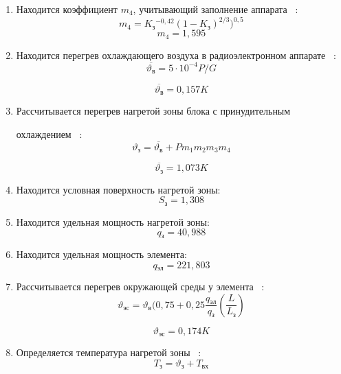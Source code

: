\begin{enumerate}[label={\arabic*.}]
\item Находится коэффициент $m_4$,
   учитывающий заполнение аппарата ~\cite{Rotkop1976}:
   \begin{equation}
     m_4 = K\mathrm{_{з}}^{-0,42}(1-K\mathrm{_{з}})^{2/3})^{0,5}
   \end{equation}
   $$m_4 = 1,595$$
  
\item Находится перегрев охлаждающего воздуха
  в радиоэлектронном аппарате ~\cite{Rotkop1976}:
  \begin{equation}
    \overline{\vartheta\mathrm{_{в}}} = 5 \cdot 10^{-4} P/G
  \end{equation}
  
  $$\overline{\vartheta\mathrm{_{в}}} = 0,157K$$

\item Рассчитывается перегрев нагретой зоны блока с принудительным

  охлаждением ~\cite{Rotkop1976}:
  \begin{equation}
    \vartheta\mathrm{_{з}} = \overline{\vartheta\mathrm{_{в}}} + P m_1 m_2 m_3 m_4
    \end{equation}
  

    $$\overline{\vartheta\mathrm{_{з}}} = 1,073 K$$

\item Находится условная поверхность нагретой зоны:
  $$S\mathrm{_{з}} = 1,308$$

\item Находится удельная мощность нагретой зоны:
  $$q\mathrm{_{з}} = 40,988$$

\item Находится удельная мощность элемента:
  $$q\mathrm{_{эл}} = 221,803$$

\item Рассчитывается перегрев окружающей
  среды у элемента ~\cite{Rotkop1976}:
  \begin{equation}
    \vartheta\mathrm{_{эс}}   =  \vartheta\mathrm{_{в}} (0,75 + 0,25\frac{q\mathrm{_{эл}}}{q\mathrm{_{з}}} (\frac{L}{L_{з}})
    \end{equation}
  
  $$\vartheta\mathrm{_{эс}} = 0,174 K$$

\item Определяется температура нагретой зоны ~\cite{Rotkop1976}:
  \begin{equation}
    T\mathrm{_{з}} = \vartheta\mathrm{_{з}} + T\mathrm{_{вх}}
  \end{equation}


\end{enumerate}
